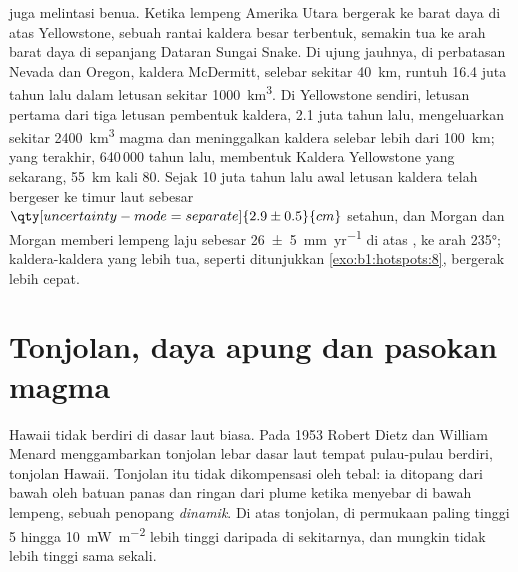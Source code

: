 \begin{omfigure}
\label{fig:b1:hotspots:map}
\end{omfigure}


 juga melintasi benua. Ketika lempeng Amerika Utara bergerak ke barat daya di atas  Yellowstone, sebuah rantai kaldera besar terbentuk, semakin tua ke arah barat daya di sepanjang Dataran Sungai Snake. Di ujung jauhnya, di perbatasan Nevada dan Oregon, kaldera McDermitt, selebar sekitar \qty{40}{km}, runtuh 16.4 juta tahun lalu dalam letusan sekitar \qty{1000}{km^3}. Di Yellowstone sendiri, letusan pertama dari tiga letusan pembentuk kaldera, 2.1 juta tahun lalu, mengeluarkan sekitar \qty{2400}{km^3} magma dan meninggalkan kaldera selebar lebih dari \qty{100}{km}; yang terakhir, 640\,000 tahun lalu, membentuk Kaldera Yellowstone yang sekarang, \qty{55}{km} kali 80. Sejak 10 juta tahun lalu awal letusan kaldera telah bergeser ke timur laut sebesar $\qty[uncertainty-mode=separate]{2.9 \pm 0.5}{cm}$ setahun, dan Morgan dan Morgan memberi lempeng laju sebesar \qty[uncertainty-mode=separate]{26 \pm 5}{mm.yr^{-1}} di atas , ke arah \ang{235}; kaldera-kaldera yang lebih tua, seperti ditunjukkan \cref{exo:b1:hotspots:8}, bergerak lebih cepat.

\section{Tonjolan, daya apung dan pasokan magma}\label{sec:b1:hotspots:swells}

Hawaii tidak berdiri di dasar laut biasa. Pada 1953 Robert Dietz dan William Menard menggambarkan tonjolan lebar dasar laut tempat pulau-pulau berdiri, tonjolan Hawaii. Tonjolan itu tidak dikompensasi oleh  tebal: ia ditopang dari bawah oleh batuan panas dan ringan dari plume ketika menyebar di bawah lempeng, sebuah penopang \emph{dinamik}. Di atas tonjolan,  di permukaan paling tinggi 5 hingga \qty{10}{mW.m^{-2}} lebih tinggi daripada di sekitarnya, dan mungkin tidak lebih tinggi sama sekali.

